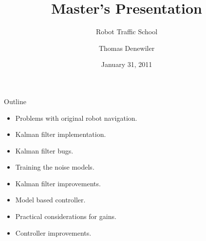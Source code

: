 \documentclass[hyperref={pdfpagelabels=false}]{beamer}
\title{Master's Presentation}
\subtitle{Robot Traffic School}
\author{Thomas Denewiler}
\institute{UCSD}
\date{January 31, 2011}
\begin{document}
\def\argmin{\mathop{\arg\,\min}\limits}
\def\argmax{\mathop{\arg\,\max}\limits}

\begin{frame}
\titlepage
\end{frame}

\begin{frame}{Outline}
\begin{itemize}
\item Problems with original robot navigation.
\item Kalman filter implementation.
\item Kalman filter bugs.
\item Training the noise models.
\item Kalman filter improvements.
\item Model based controller.
\item Practical considerations for gains.
\item Controller improvements.
\end{itemize}
\end{frame}
\end{document}
